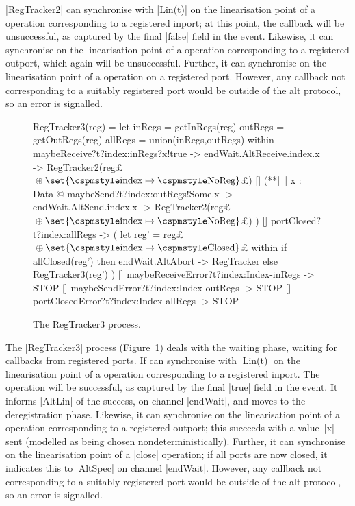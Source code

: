 |RegTracker2| can synchronise with |Lin(t)| on the linearisation point of a
 operation corresponding to a registered inport; at this
point, the callback will be unsuccessful, as captured by the final |false|
field in the event.  Likewise, it can synchronise on the linearisation point
of a  operation corresponding to a registered outport, which
again will be unsuccessful.  Further, it can synchronise on the linearisation
point of a  operation on a registered port.  However, any
callback not corresponding to a suitably registered port would be outside of
the alt protocol, so an error is signalled. 


\begin{figure}
\begin{cspm}
RegTracker3(reg) = 
  let inRegs = getInRegs(reg) 
      outRegs = getOutRegs(reg)
      allRegs = union(inRegs,outRegs) within
  maybeReceive?t?index:inRegs?x!true -> 
    endWait.AltReceive.index.x -> RegTracker2(reg£%
    $\null\oplus \set{\CSPMMR{index} \mapsto \CSPMMR{NoReg}}$£)
  [] (**|~| x : Data @ maybeSend?t?index:outRegs!Some.x -> 
     endWait.AltSend.index.x -> RegTracker2(reg£%
    $\null\oplus \set{\CSPMMR{index} \mapsto \CSPMMR{NoReg}}$£) )
  [] portClosed?t?index:allRegs -> ( 
    let reg' = reg£%
      $\null\oplus \set{\CSPMMR{index} \mapsto \CSPMMR{Closed}}$£ within
    if allClosed(reg') then endWait.AltAbort -> RegTracker else RegTracker3(reg')
  )
  [] maybeReceiveError?t?index:Index-inRegs -> STOP
  [] maybeSendError?t?index:Index-outRegs -> STOP
  [] portClosedError?t?index:Index-allRegs -> STOP
\end{cspm}
\caption{The {\scalastyle RegTracker3} process.  \label{fig:RegTracker3}}
\end{figure}


The |RegTracker3| process (Figure~\ref{fig:RegTracker3}) deals with the
waiting phase, waiting for callbacks from registered ports.  If can
synchronise with |Lin(t)| on the linearisation point of a 
operation corresponding to a registered inport.  The operation will be
successful, as captured by the final |true| field in the event.  It informs
|AltLin| of the success, on channel |endWait|, and moves to the deregistration
phase.  Likewise, it can synchronise on the linearisation point of a
 operation corresponding to a registered outport; this
succeeds with a value~|x| sent (modelled as being chosen
nondeterministically).  Further, it can synchronise on the linearisation point
of a |close| operation; if all ports are now closed, it indicates this to
|AltSpec| on channel |endWait|.  However, any callback not corresponding to a
suitably registered port would be outside of the alt protocol, so an error is
signalled.

